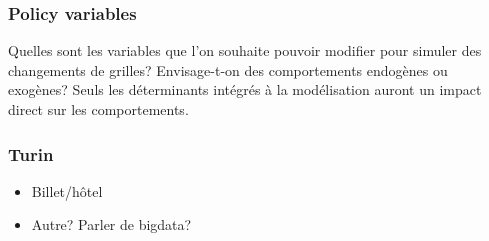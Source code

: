 \documentclass[11pt,a4paper]{article}
\begin{document}
\subsubsection*{Policy variables}

Quelles sont les variables que l'on souhaite pouvoir modifier pour simuler des changements de grilles? Envisage-t-on des comportements endogènes ou exogènes? Seuls les déterminants  intégrés à la modélisation auront un impact direct sur les comportements. 



\subsubsection*{Turin}

\begin{itemize}[leftmargin=1cm ,parsep=0cm,itemsep=0cm,topsep=0cm] 
\item Billet/hôtel
\item Autre? Parler de bigdata?
\end{itemize}
\end{document}
